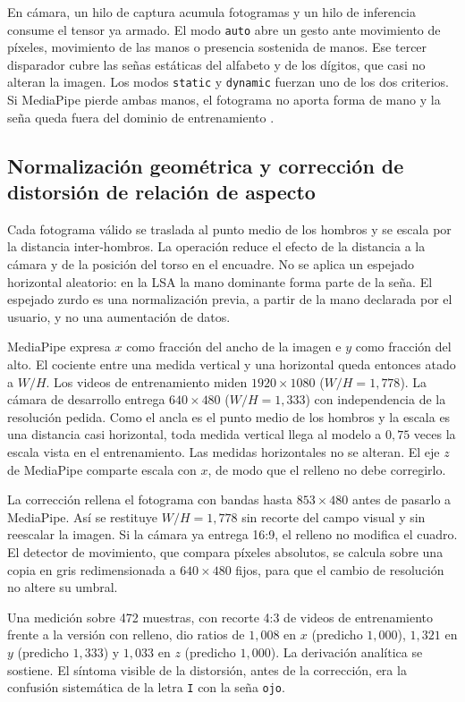 En cámara, un hilo de captura acumula fotogramas y un hilo de inferencia consume el tensor ya armado. El modo \texttt{auto} abre un gesto ante movimiento de píxeles, movimiento de las manos o presencia sostenida de manos. Ese tercer disparador cubre las señas estáticas del alfabeto y de los dígitos, que casi no alteran la imagen. Los modos \texttt{static} y \texttt{dynamic} fuerzan uno de los dos criterios. Si MediaPipe pierde ambas manos, el fotograma no aporta forma de mano y la seña queda fuera del dominio de entrenamiento \parencite{google2020mediapipe}.

\subsection{Normalización geométrica y corrección de distorsión de relación de aspecto}

Cada fotograma válido se traslada al punto medio de los hombros y se escala por la distancia inter-hombros. La operación reduce el efecto de la distancia a la cámara y de la posición del torso en el encuadre. No se aplica un espejado horizontal aleatorio: en la LSA la mano dominante forma parte de la seña. El espejado zurdo es una normalización previa, a partir de la mano declarada por el usuario, y no una aumentación de datos.

MediaPipe expresa $x$ como fracción del ancho de la imagen e $y$ como fracción del alto. El cociente entre una medida vertical y una horizontal queda entonces atado a $W/H$. Los videos de entrenamiento miden $1920 \times 1080$ ($W/H = 1{,}778$). La cámara de desarrollo entrega $640 \times 480$ ($W/H = 1{,}333$) con independencia de la resolución pedida. Como el ancla es el punto medio de los hombros y la escala es una distancia casi horizontal, toda medida vertical llega al modelo a $0{,}75$ veces la escala vista en el entrenamiento. Las medidas horizontales no se alteran. El eje $z$ de MediaPipe comparte escala con $x$, de modo que el relleno no debe corregirlo.

La corrección rellena el fotograma con bandas hasta $853 \times 480$ antes de pasarlo a MediaPipe. Así se restituye $W/H = 1{,}778$ sin recorte del campo visual y sin reescalar la imagen. Si la cámara ya entrega 16:9, el relleno no modifica el cuadro. El detector de movimiento, que compara píxeles absolutos, se calcula sobre una copia en gris redimensionada a $640 \times 480$ fijos, para que el cambio de resolución no altere su umbral.

Una medición sobre 472 muestras, con recorte 4:3 de videos de entrenamiento frente a la versión con relleno, dio ratios de $1{,}008$ en $x$ (predicho $1{,}000$), $1{,}321$ en $y$ (predicho $1{,}333$) y $1{,}033$ en $z$ (predicho $1{,}000$). La derivación analítica se sostiene. El síntoma visible de la distorsión, antes de la corrección, era la confusión sistemática de la letra \texttt{I} con la seña \texttt{ojo}.

